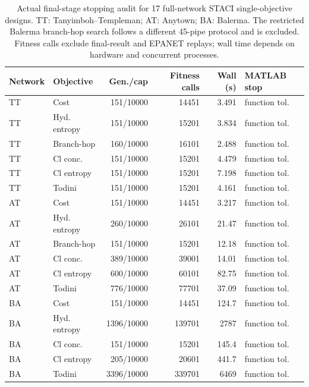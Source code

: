 \begin{table}[H]
\centering\scriptsize
\caption{Actual final-stage stopping audit for 17 full-network STACI single-objective designs. TT: Tanyimboh--Templeman; AT: Anytown; BA: Balerma. The restricted Balerma branch-hop search follows a different 45-pipe protocol and is excluded. Fitness calls exclude final-result and EPANET replays; wall time depends on hardware and concurrent processes.}
\label{tab:ga-stops}
\begin{tabular}{llrrrl}
\toprule
Network & Objective & Gen./cap & Fitness calls & Wall (s) & MATLAB stop \\
\midrule
TT & Cost & 151/10000 & 14451 & 3.491 & function tol. \\
TT & Hyd. entropy & 151/10000 & 15201 & 3.834 & function tol. \\
TT & Branch-hop & 160/10000 & 16101 & 2.488 & function tol. \\
TT & Cl conc. & 151/10000 & 15201 & 4.479 & function tol. \\
TT & Cl entropy & 151/10000 & 15201 & 7.198 & function tol. \\
TT & Todini & 151/10000 & 15201 & 4.161 & function tol. \\
AT & Cost & 151/10000 & 14451 & 3.217 & function tol. \\
AT & Hyd. entropy & 260/10000 & 26101 & 21.47 & function tol. \\
AT & Branch-hop & 151/10000 & 15201 & 12.18 & function tol. \\
AT & Cl conc. & 389/10000 & 39001 & 14.01 & function tol. \\
AT & Cl entropy & 600/10000 & 60101 & 82.75 & function tol. \\
AT & Todini & 776/10000 & 77701 & 37.09 & function tol. \\
BA & Cost & 151/10000 & 14451 & 124.7 & function tol. \\
BA & Hyd. entropy & 1396/10000 & 139701 & 2787 & function tol. \\
BA & Cl conc. & 151/10000 & 15201 & 145.4 & function tol. \\
BA & Cl entropy & 205/10000 & 20601 & 441.7 & function tol. \\
BA & Todini & 3396/10000 & 339701 & 6469 & function tol. \\
\bottomrule
\end{tabular}
\end{table}
